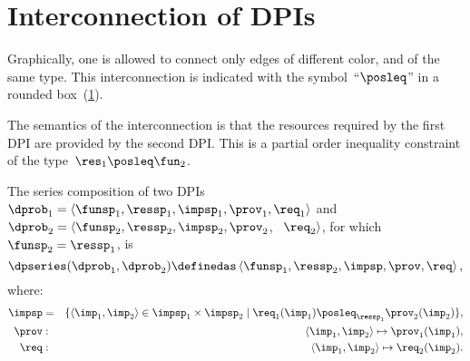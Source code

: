 

\section{Interconnection of DPIs}


Graphically, one is allowed to connect only edges of different
color, and of the same type. This interconnection is indicated with the symbol~``$\posleq$''
in a rounded box~(\cref{fig:connection}).

\begin{figure}[h]
  \centering
  \caption{\label{fig:connection}}
\end{figure}


\noindent The semantics of the interconnection is that the resources
required by the first DPI are provided by the second DPI. This is
a partial order inequality constraint of the type~$\res_{1}\posleq\fun_{2}$.


\begin{definition}
  \label{def:series-composition}The series composition of two DPIs
  ~$\dprob_{1}=\langle\funsp_{1},\ressp_{1},\impsp_{1},\prov_{1},\req_{1}\rangle$
  and~$\dprob_{2}=\langle\funsp_{2},\ressp_{2},\impsp_{2},\prov_{2}$,
  ~$\req_{2}\rangle$, for which~$\funsp_{2}=\ressp_{1}$, is
  \begin{equation}
    \dpseries(\dprob_{1},\dprob_{2})\definedas\left\langle \funsp_{1},\ressp_{2},\impsp,\prov,\req\right\rangle ,
  \end{equation}
  where:
  \begin{eqnarray}
    \impsp & = & \{\left\langle \imp_{1},\imp_{2}\right\rangle \in\impsp_{1}\times\impsp_{2}\mid\req_{1}(\imp_{1})\posleq_{\ressp_{1}}\prov_{2}(\imp_{2})\},\\
    \prov & : & \left\langle \imp_{1},\imp_{2}\right\rangle \mapsto\prov_{1}(\imp_{1}),\\
    \req & : & \left\langle \imp_{1},\imp_{2}\right\rangle \mapsto\req_{2}(\imp_{2}).
  \end{eqnarray}
\end{definition}







